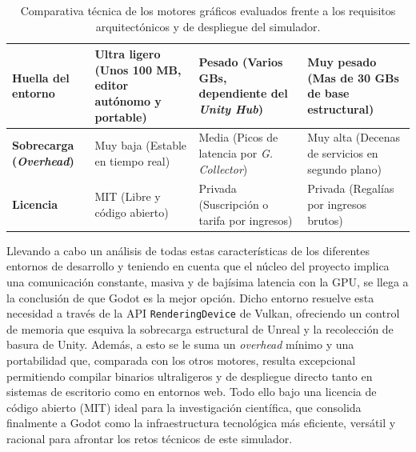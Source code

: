 \begin{table}[H]
{\begin{tabular}{|p{3.5cm}|p{3.8cm}|p{3.8cm}|p{3.8cm}|}
            \textbf{Huella del entorno } & Ultra ligero \newline (Unos 100 MB, editor autónomo y portable) & Pesado \newline (Varios GBs, dependiente del \textit{Unity Hub}) & Muy pesado \newline (Mas de 30 GBs de base estructural) \\ \hline
            
            \textbf{Sobrecarga (\textit{Overhead})} & Muy baja \newline (Estable en tiempo real) & Media \newline (Picos de latencia por \textit{G. Collector}) & Muy alta \newline (Decenas de servicios en segundo plano) \\ \hline
            
            \textbf{Licencia} & MIT \newline (Libre y código abierto) & Privada \newline (Suscripción o tarifa por ingresos) & Privada \newline (Regalías por ingresos brutos) \\ \hline
        \end{tabular}
    }
    \caption[Comparativa técnica de motores gráficos]{Comparativa técnica de los motores gráficos evaluados frente a los requisitos arquitectónicos y de despliegue del simulador.}
    \label{tab:comparativa_motores}
\end{table}
\clearpage

Llevando a cabo un análisis de todas estas características de los diferentes entornos de desarrollo y teniendo en cuenta que el núcleo del proyecto implica una comunicación constante, masiva y de bajísima latencia con la GPU, se llega a la conclusión de que Godot es la mejor opción. Dicho entorno resuelve esta necesidad a través de la API \texttt{RenderingDevice} de Vulkan, ofreciendo un control de memoria que esquiva la sobrecarga estructural de Unreal y la recolección de basura de Unity. Además, a esto se le suma un \textit{overhead} mínimo y una portabilidad que, comparada con los otros motores, resulta excepcional permitiendo compilar binarios ultraligeros y de despliegue directo tanto en sistemas de escritorio como en entornos web. Todo ello bajo una licencia de código abierto (MIT) ideal para la investigación científica, que consolida finalmente a Godot como la infraestructura tecnológica más eficiente, versátil y racional para afrontar los retos técnicos de este simulador.\\


